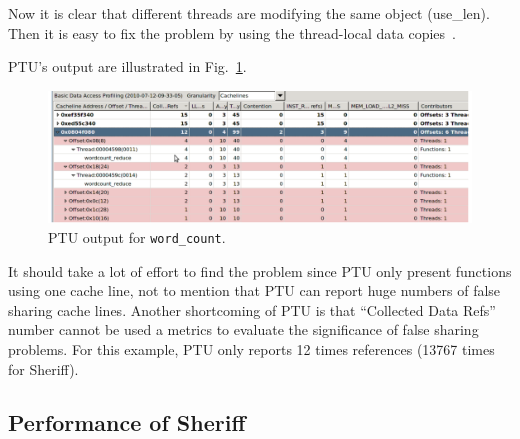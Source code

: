Now it is clear that different threads are modifying the same object (use\_len). 
Then it is easy to fix the problem by using the thread-local data copies~\cite{detect:intel}. 

PTU's output are illustrated in Fig.~\ref{fig:wordcount}. 
\begin{figure}[!t]
\centering
\includegraphics[width=6in]{sheriff/figure/wordcount}
\caption{PTU output for \texttt{word\_count}.
\label{fig:wordcount}}
\end{figure}

It should take a lot of effort to find the problem since PTU only present functions using 
one cache line, not to mention that PTU can report huge numbers of false sharing cache lines.
Another shortcoming of PTU is that ``Collected Data Refs'' number cannot be used a metrics 
to evaluate the significance of false sharing problems. For this example, PTU only reports 
12 times references (13767 times for Sheriff). 

\subsection{Performance of Sheriff}
\label{sec:results-runtime-overhead}

